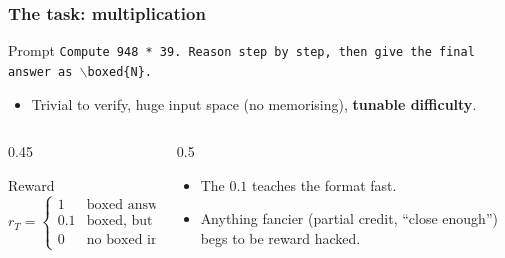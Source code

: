\begin{frame}
    \frametitle{The task: multiplication}
    \begin{block}{Prompt}
        \texttt{\small Compute 948 * 39. Reason step by step, then give the final answer as $\backslash$boxed\{N\}.}
    \end{block}
    \begin{itemize}
        \item Trivial to verify, huge input space (no memorising), \textbf{tunable difficulty}.
    \end{itemize}

    \begin{columns}
    \begin{column}{0.45\linewidth}
    \begin{block}{Reward}
        \vspace{-0.3cm}
        $$
        r_T = \begin{cases}
            1 & \text{boxed answer correct} \\
            0.1 & \text{boxed, but wrong} \\
            0 & \text{no boxed integer}
        \end{cases}
        $$
    \end{block}
    \end{column}
    \begin{column}{0.5\linewidth}
    \begin{itemize}
        \item The $0.1$ teaches the format fast.
        \item Anything fancier (partial credit, ``close enough'') begs to be reward hacked.
    \end{itemize}
    \end{column}
    \end{columns}
\end{frame}

